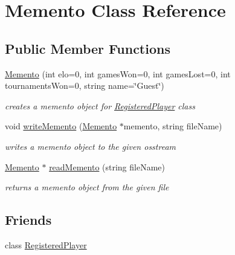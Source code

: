 \hypertarget{classMemento}{
\section{Memento Class Reference}
\label{classMemento}
}
\subsection*{Public Member Functions}
\begin{DoxyCompactItemize}
\item 
\hyperlink{classMemento_a00be4fd2d6ba40b9c7e212a64a834f81}{Memento} (int elo=0, int gamesWon=0, int gamesLost=0, int tournamentsWon=0, string name=\char`\"{}Guest\char`\"{})
\begin{DoxyCompactList}\small\item\em creates a memento object for \hyperlink{classRegisteredPlayer}{RegisteredPlayer} class \item\end{DoxyCompactList}\item 
void \hyperlink{classMemento_ae1c59cf9a5ed24dfcbe15d57ee24c095}{writeMemento} (\hyperlink{classMemento}{Memento} $\ast$memento, string fileName)
\begin{DoxyCompactList}\small\item\em writes a memento object to the given osstream \item\end{DoxyCompactList}\item 
\hyperlink{classMemento}{Memento} $\ast$ \hyperlink{classMemento_ad159304bd2710dc9dc9c2ed523075dd0}{readMemento} (string fileName)
\begin{DoxyCompactList}\small\item\em returns a memento object from the given file \item\end{DoxyCompactList}\end{DoxyCompactItemize}
\subsection*{Friends}
\begin{DoxyCompactItemize}
\item 
\hypertarget{classMemento_acb406df94b9d48567f42bbe73b2bd234}{
class \hyperlink{classMemento_acb406df94b9d48567f42bbe73b2bd234}{RegisteredPlayer}}
\label{classMemento_acb406df94b9d48567f42bbe73b2bd234}

\end{DoxyCompactItemize}


